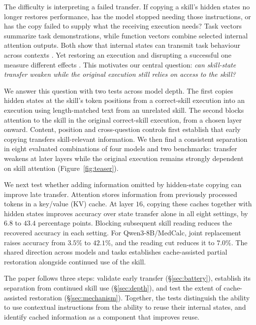 The difficulty is interpreting a failed transfer. If copying a skill's
hidden states no longer restores performance, has the model stopped
needing those instructions, or has the copy failed to supply what the
receiving execution needs? Task vectors summarize task demonstrations,
while function vectors combine selected internal attention outputs.
Both show that internal states can transmit task behaviour across contexts
\citep{hendel2023taskvectors,todd2024functionvectors}. Yet restoring an
execution and disrupting a successful one measure different effects
\citep{heimersheim2024patching}. This motivates our central question:
\emph{can skill-state transfer weaken while the original execution still
relies on access to the skill?}

We answer this question with two tests across model depth. The first
copies hidden states at the skill's token positions from a correct-skill
execution into an execution using length-matched text from an unrelated skill. The
second blocks attention to the skill in the original correct-skill
execution, from a chosen layer onward. Content, position and cross-question
controls first establish that early copying transfers skill-relevant
information. We then find a consistent separation in eight evaluated
combinations of four models and two benchmarks: transfer weakens at later
layers while the original execution remains strongly dependent on skill
attention (Figure~\ref{fig:teaser}).

We next test whether adding information omitted by hidden-state copying
can improve late transfer. Attention stores information from previously
processed tokens in a key/value (KV) cache. At layer $16$, copying these
caches together with hidden states improves accuracy over state transfer
alone in all eight settings, by $6.8$ to $43.4$ percentage points.
Blocking subsequent skill reading reduces the recovered accuracy in each
setting. For Qwen3-8B/MedCalc, joint replacement raises accuracy from
$3.5\%$ to $42.1\%$, and the reading cut reduces it to $7.0\%$.
The shared direction across models and tasks establishes cache-assisted
partial restoration alongside continued use of the skill.

The paper follows three steps: validate early transfer
(\S\ref{sec:battery}), establish its separation from continued skill use
(\S\ref{sec:depth}), and test the extent of cache-assisted restoration
(\S\ref{sec:mechanism}). Together, the tests distinguish the ability to
use contextual instructions from the ability to reuse their internal
states, and identify cached information as a component that improves reuse.
